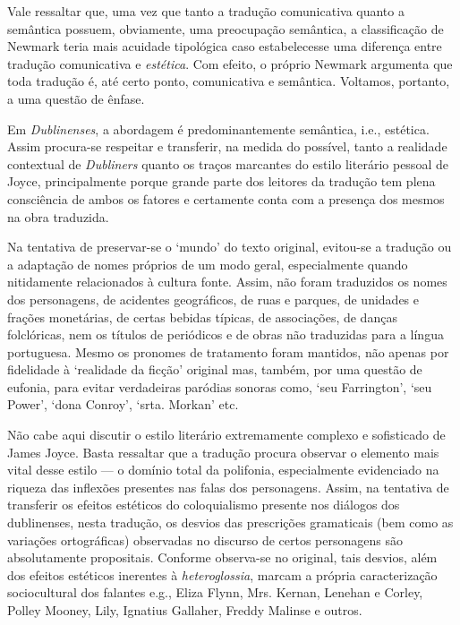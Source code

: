 Vale ressaltar que, uma vez que tanto a tradução comunicativa quanto a
semântica possuem, obviamente, uma preocupação semântica, a
classificação de Newmark teria mais acuidade tipológica caso
estabelecesse uma diferença entre tradução comunicativa e \textit{estética}.
Com efeito, o próprio Newmark argumenta que toda tradução é, até
certo ponto, comunicativa e semântica. Voltamos, portanto, a uma
questão de ênfase.

Em \textit{Dublinenses}, a abordagem é predominantemente semântica, i.e.,
estética. Assim procura-se respeitar e transferir, na medida do
possível, tanto a realidade contextual de \textit{Dubliners} quanto os traços
marcantes do estilo literário pessoal de Joyce, principalmente
porque grande parte dos leitores da tradução tem plena consciência de
ambos os fatores e certamente conta com a presença dos mesmos na
obra traduzida.

Na tentativa de preservar-se o `mundo' do texto original, evitou-se
a tradução ou a adaptação de nomes próprios de um modo geral,
especialmente quando nitidamente relacionados à cultura fonte. Assim,
não foram traduzidos os nomes dos personagens, de acidentes
geográficos, de ruas e parques, de unidades e frações monetárias, de
certas bebidas típicas, de associações, de danças folclóricas, nem os
títulos de periódicos e de obras não traduzidas para a língua
portuguesa. Mesmo os pronomes de tratamento foram mantidos, não apenas
por fidelidade à `realidade da ficção' original mas, também, por
uma questão de eufonia, para evitar verdadeiras paródias sonoras como,
`seu Farrington', `seu Power', `dona Conroy', `srta.
Morkan' etc.

Não cabe aqui discutir o estilo literário extremamente complexo e
sofisticado de James Joyce. Basta ressaltar que a tradução procura
observar o elemento mais vital desse estilo --- o domínio total da
polifonia, especialmente evidenciado na riqueza das inflexões
presentes nas falas dos personagens. Assim, na tentativa de transferir
os efeitos estéticos do coloquialismo presente nos diálogos dos
dublinenses, nesta tradução, os desvios das prescrições gramaticais
(bem como as variações ortográficas) observadas no discurso de certos
personagens são absolutamente propositais. Conforme observa-se no
original, tais desvios, além dos efeitos estéticos inerentes à
\textit{heteroglossia}, marcam a própria caracterização sociocultural dos
falantes e.g., Eliza Flynn, Mrs. Kernan, Lenehan e Corley, Polley
Mooney, Lily, Ignatius Gallaher, Freddy Malinse e outros.

